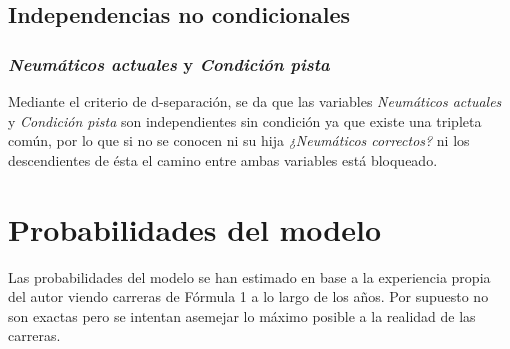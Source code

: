 \documentclass[]{article}
\begin{document}
\subsection{Independencias no condicionales}
\subsubsection{\textit{Neumáticos actuales} y \textit{Condición pista}}
Mediante el criterio de d-separación, se da que las variables \textit{Neumáticos actuales} y \textit{Condición pista} son independientes sin condición ya que existe una tripleta común, por lo que si no se conocen ni su hija \textit{¿Neumáticos correctos?} ni los descendientes de ésta el camino entre ambas variables está bloqueado.
\section{Probabilidades del modelo}
Las probabilidades del modelo se han estimado en base a la experiencia propia del autor viendo carreras de Fórmula 1 a lo largo de los años. Por supuesto no son exactas pero se intentan asemejar lo máximo posible a la realidad de las carreras.
\end{document}
